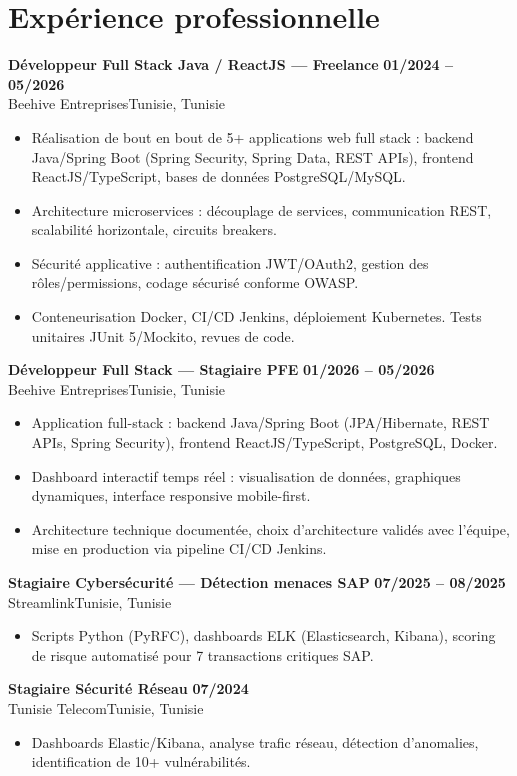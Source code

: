 \documentclass[a4paper,10pt]{article}
\newcommand{\cventry}[4]{\textbf{#1} \hfill \textbf{#4}\\[0.5pt]#2{\ifx\relax#3\relax\else, #3\fi}\par\vspace{1pt}}
\begin{document}
\section{Expérience professionnelle}
\cventry{Développeur Full Stack Java / ReactJS --- Freelance}{Beehive Entreprises}{Tunisie}{01/2024 -- 05/2026}
\begin{itemize}
  \item Réalisation de bout en bout de 5+ applications web full stack : backend Java/Spring Boot (Spring Security, Spring Data, REST APIs), frontend ReactJS/TypeScript, bases de données PostgreSQL/MySQL.
  \item Architecture microservices : découplage de services, communication REST, scalabilité horizontale, circuits breakers.
  \item Sécurité applicative : authentification JWT/OAuth2, gestion des rôles/permissions, codage sécurisé conforme OWASP.
  \item Conteneurisation Docker, CI/CD Jenkins, déploiement Kubernetes. Tests unitaires JUnit 5/Mockito, revues de code.
\end{itemize}
\cventry{Développeur Full Stack --- Stagiaire PFE}{Beehive Entreprises}{Tunisie}{01/2026 -- 05/2026}
\begin{itemize}
  \item Application full-stack : backend Java/Spring Boot (JPA/Hibernate, REST APIs, Spring Security), frontend ReactJS/TypeScript, PostgreSQL, Docker.
  \item Dashboard interactif temps réel : visualisation de données, graphiques dynamiques, interface responsive mobile-first.
  \item Architecture technique documentée, choix d'architecture validés avec l'équipe, mise en production via pipeline CI/CD Jenkins.
\end{itemize}
\cventry{Stagiaire Cybersécurité --- Détection menaces SAP}{Streamlink}{Tunisie}{07/2025 -- 08/2025}
\begin{itemize}
  \item Scripts Python (PyRFC), dashboards ELK (Elasticsearch, Kibana), scoring de risque automatisé pour 7 transactions critiques SAP.
\end{itemize}
\cventry{Stagiaire Sécurité Réseau}{Tunisie Telecom}{Tunisie}{07/2024}
\begin{itemize}
  \item Dashboards Elastic/Kibana, analyse trafic réseau, détection d'anomalies, identification de 10+ vulnérabilités.
\end{itemize}
\end{document}
